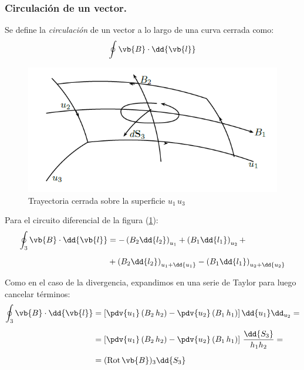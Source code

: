 \subsubsection{Circulación de un vector.}

Se define la \emph{circulación} de un vector a lo largo de una curva cerrada como:
\begin{align*}
\oint \vb{B} \cdot \dd{\vb{l}}
\end{align*}

\begin{figure}[H]
    \centering
    \includegraphics[scale=0.75]{Imagenes/Circulacion_Vector.png}
    \caption{Trayectoria cerrada sobre la superficie $u_{1} \, u_{3}$}
    \label{fig:figura_trayectoria_cerrada}
\end{figure}

Para el circuito diferencial de la figura (\ref{fig:figura_trayectoria_cerrada}):
\begin{align*}
\oint_{3} \vb{B} \cdot \dd{\vb{l}} &= - \left( B_{2} \dd{l_{2}} \right)_{u_{1}} + \left( B_{1} \dd{l_{1}} \right)_{u_{2}} + \\[0.5em]
&+ \left( B_{2} \dd{l_{2}} \right)_{u_{1}+\dd{u_{1}}} - \left( B_{1} \dd{l_{1}} \right)_{u_{2}+\dd{u_{2}}}
\end{align*}

Como en el caso de la divergencia, expandimos en una serie de Taylor para luego cancelar términos:
\begin{align*}
\oint_{3} \vb{B} \cdot \dd{\vb{l}} &= \left[ \displaystyle \pdv{u_{1}} \left( B_{2} \, h_{2}\right) - \pdv{u_{2}} \left( B_{1} \, h_{1} \right) \right] \dd{u_{1}} \dd_{u_{2}} = \\[0.5em] 
&= \left[ \pdv{u_{1}} \left( B_{2} \, h_{2}\right) - \pdv{u_{2}} \left( B_{1} \, h_{1} \right) \right] \, \dfrac{\dd{S_{3}}}{h_{1} h_{2}} = \\[0.5em] 
&= ({\rm{Rot}} \, \vb{B})_{3} \dd{S_{3}}
\end{align*}

